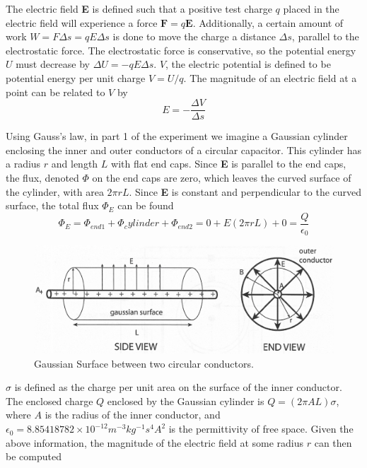 \documentclass[letterpaper]{article}
\begin{document}
The electric field \textbf{E} is defined such that a positive test charge $q$
placed in the electric field will experience a force $\textbf{F}=q\textbf{E}$.
Additionally, a certain amount of work $W=F \Delta s=qE\Delta s$ is done to move the charge
a distance $\Delta s$, parallel to the electrostatic force. The electrostatic force is
conservative, so the potential energy $U$ must decrease by $\Delta U=-qE\Delta s$.
$V$, the electric potential is defined to be potential energy per unit charge $V=U/q$.
The magnitude of an electric field at a point can be related to $V$ by
\begin{equation}
  E=-\frac{\Delta V}{\Delta s} \label{eq1}
\end{equation}

Using Gauss's law, in part 1 of the experiment we imagine a Gaussian cylinder enclosing
the inner and outer conductors of a circular capacitor. This cylinder has a radius $r$ and
length $L$ with flat end caps. Since \textbf{E} is parallel to the end caps, the flux, denoted $\Phi$ on
the end caps are zero, which leaves the curved surface of the cylinder, with area $2\pi rL$.
Since \textbf{E} is constant and perpendicular to the curved surface, the total flux $\Phi_E$ can be found
\begin{equation}
  \Phi_E = \Phi_{end1} + \Phi_cylinder + \Phi_{end2} = 0+E(2\pi rL) + 0 =\frac{Q}{\epsilon_0}
\end{equation}
\begin{figure}[H]
    \centering
    \includegraphics[width=\textwidth]{fig1.jpg}
    \caption{Gaussian Surface between two circular conductors. \cite{labmanual}}
\end{figure}

$\sigma$ is defined as the charge per unit area on the surface of the inner conductor.
The enclosed charge $Q$ enclosed by the Gaussian cylinder is $Q=(2 \pi AL)\sigma$, where
$A$ is the radius of the inner conductor, and $\epsilon_0=8.85418782 \times 10^{-12} m^{-3} kg^{-1} s^{4} A^{2}$ is the permittivity of free space.
Given the above information, the magnitude of the electric field at some radius $r$
can then be computed
\end{document}
